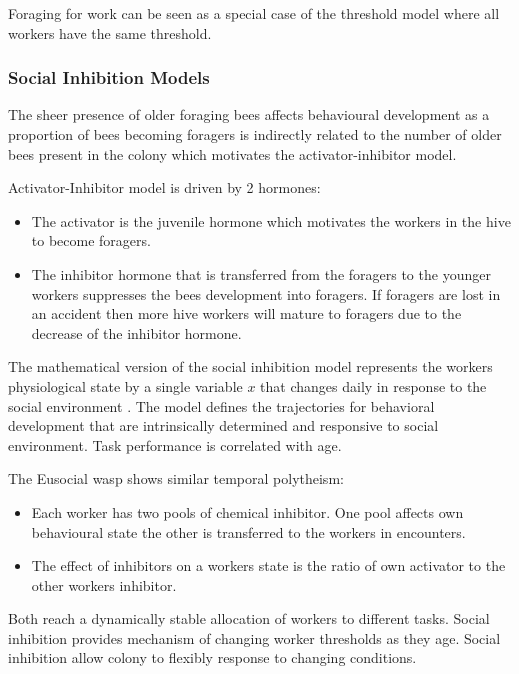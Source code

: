 Foraging for work can be seen as a special case of the threshold model where all workers have the same threshold. %

\subsubsection{Social Inhibition Models}

The sheer presence of older foraging bees affects behavioural development as a proportion of bees becoming foragers is indirectly related to the number of older bees present in the colony  which motivates the activator-inhibitor model.

Activator-Inhibitor model is driven by 2 hormones:
\begin{itemize}
	\item The activator is the juvenile hormone which motivates the workers in the hive to become foragers.
	\item The inhibitor hormone that is transferred from the foragers to the younger workers suppresses the bees development into foragers. If foragers are lost in an accident then more hive workers will mature to foragers due to the decrease of the inhibitor hormone.
\end{itemize}

The mathematical version of the social inhibition model represents the workers physiological state by a single variable $x$ that changes daily in response to the social environment \cite{beshers2001social}. The model defines the trajectories for behavioral development that are intrinsically determined and responsive to social environment. Task performance is correlated with age. 

The Eusocial wasp shows similar temporal polytheism:
\begin{itemize}
	\item Each worker has two pools of chemical inhibitor. One pool affects own behavioural state the other is transferred to the workers in encounters. 
	\item The effect of inhibitors on a workers state is the ratio of own activator to the other workers inhibitor.
\end{itemize}

Both reach a dynamically stable allocation of workers to different tasks. Social inhibition provides mechanism of changing worker thresholds as they age. Social inhibition allow colony to flexibly response to changing conditions.

